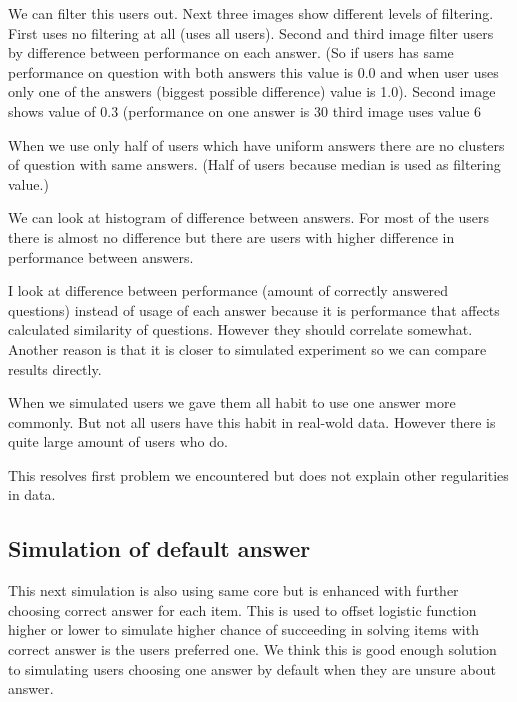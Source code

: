 \documentclass[
  digital, %
  table,   %
  nolof,     %
  nolot,     %
  nocover
]{fithesis3}
\begin{document}

We can filter this users out. Next three images show different levels of
filtering. First uses no filtering at all (uses all users). Second and
third image filter users by difference between performance on each
answer. (So if users has same performance on question with both answers
this value is 0.0 and when user uses only one of the answers (biggest
possible difference) value is 1.0). Second image shows value of 0.3
(performance on one answer is 30%
third image uses value 6%


When we use only half of users which have uniform answers there are no
clusters of question with same answers. (Half of users because median is
used as filtering value.)

We can look at histogram of difference between answers. For most of the
users there is almost no difference but there are users with higher
difference in performance between answers.


I look at difference between performance (amount of correctly answered
questions) instead of usage of each answer because it is performance
that affects calculated similarity of questions. However they should
correlate somewhat. Another reason is that it is closer to simulated
experiment so we can compare results directly.

When we simulated users we gave them all habit to use one answer more
commonly. But not all users have this habit in real-wold data. However
there is quite large amount of users who do.

This resolves first problem we encountered but does not explain other
regularities in data.

\subsection{Simulation of default answer}\label{simulation-of-default-answer}

This next simulation is also using same core but is enhanced with further choosing correct answer for each item. This is used to offset logistic function higher or lower to simulate higher chance of succeeding in solving items with correct answer is the users preferred one. We think this is good enough solution to simulating users choosing one answer by default when they are unsure about answer.
\end{document}
